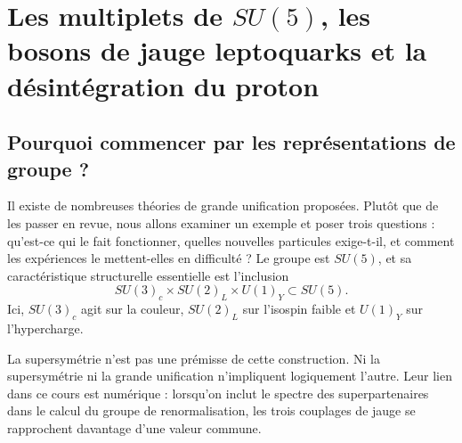\chapter{Les multiplets de \texorpdfstring{\(SU(5)\)}{SU(5)}, les bosons de jauge leptoquarks et la désintégration du proton}


\section{Pourquoi commencer par les représentations de groupe ?}

Il existe de nombreuses théories de grande unification proposées. Plutôt que de les passer en revue, nous allons examiner un exemple et poser trois questions : qu’est-ce qui le fait fonctionner, quelles nouvelles particules exige-t-il, et comment les expériences le mettent-elles en difficulté ? Le groupe est \(SU(5)\), et sa caractéristique structurelle essentielle est l’inclusion
\begin{equation}
SU(3)_c\times SU(2)_L\times U(1)_Y
\subset SU(5).
\label{eq:l10-sm-embedding}
\end{equation}
Ici, \(SU(3)_c\) agit sur la couleur, \(SU(2)_L\) sur l’isospin faible et \(U(1)_Y\) sur l’hypercharge.

La supersymétrie n’est pas une prémisse de cette construction. Ni la supersymétrie ni la grande unification n’impliquent logiquement l’autre. Leur lien dans ce cours est numérique : lorsqu’on inclut le spectre des superpartenaires dans le calcul du groupe de renormalisation, les trois couplages de jauge se rapprochent davantage d’une valeur commune.

